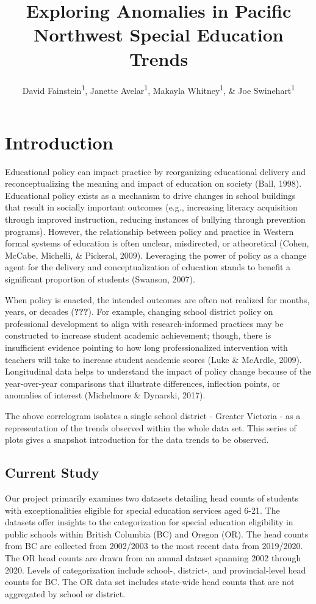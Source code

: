 \documentclass[
  english,
  man,floatsintext]{apa6}
\title{Exploring Anomalies in Pacific Northwest Special Education Trends}
\author{David Fainstein\textsuperscript{1}, Janette Avelar\textsuperscript{1}, Makayla Whitney\textsuperscript{1}, \& Joe Swinehart\textsuperscript{1}}
\date{}
\affiliation{\vspace{0.5cm}\textsuperscript{1} University of Oregon}
\begin{document}
\maketitle

\hypertarget{introduction}{%
\section{Introduction}\label{introduction}}

Educational policy can impact practice by reorganizing educational delivery and reconceptualizing the meaning and impact of education on society (Ball, 1998). Educational policy exists as a mechanism to drive changes in school buildings that result in socially important outcomes (e.g., increasing literacy acquisition through improved instruction, reducing instances of bullying through prevention programs). However, the relationship between policy and practice in Western formal systems of education is often unclear, misdirected, or atheoretical (Cohen, McCabe, Michelli, \& Pickeral, 2009). Leveraging the power of policy as a change agent for the delivery and conceptualization of education stands to benefit a significant proportion of students (Swanson, 2007).

When policy is enacted, the intended outcomes are often not realized for months, years, or decades ({\textbf{???}}). For example, changing school district policy on professional development to align with research-informed practices may be constructed to increase student academic achievement; though, there is insufficient evidence pointing to how long professionalized intervention with teachers will take to increase student academic scores (Luke \& McArdle, 2009). Longitudinal data helps to understand the impact of policy change because of the year-over-year comparisons that illustrate differences, inflection points, or anomalies of interest (Michelmore \& Dynarski, 2017).

The above correlogram isolates a single school district - Greater Victoria - as a representation of the trends observed within the whole data set. This series of plots gives a snapshot introduction for the data trends to be observed.

\hypertarget{current-study}{%
\subsection{Current Study}\label{current-study}}

Our project primarily examines two datasets detailing head counts of students with exceptionalities eligible for special education services aged 6-21. The datasets offer insights to the categorization for special education eligibility in public schools within British Columbia (BC) and Oregon (OR). The head counts from BC are collected from 2002/2003 to the most recent data from 2019/2020. The OR head counts are drawn from an annual dataset spanning 2002 through 2020. Levels of categorization include school-, district-, and provincial-level head counts for BC. The OR data set includes state-wide head counts that are not aggregated by school or district.
\end{document}
